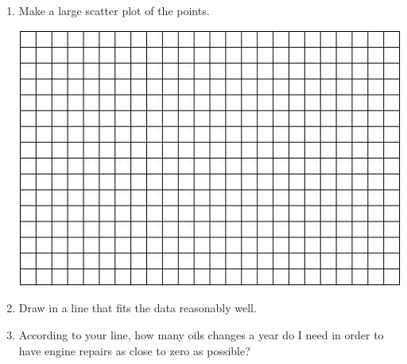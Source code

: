\documentclass[12pt]{article}
\begin{document}
\begin{enumerate}
\begin{enumerate}
\item Make a large scatter plot of the points. 

\vspace{.1in}
\begin{center}
 {\includegraphics [width = 6in] {../GraphPaper}}
\end{center}
\vspace{.1in}

\item Draw in a line that fits the data reasonably well.
\item  According to your line, how many oils changes a year do I need in order to have engine repairs as close to zero as possible?
\end{enumerate}

\end{enumerate}
\end{document}
